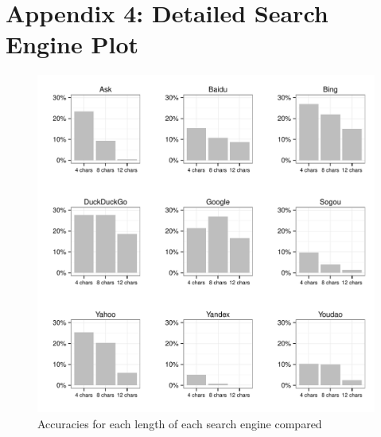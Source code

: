 \documentclass{csfourzero}
\begin{document}
\section{Appendix 4: Detailed Search Engine Plot}
\begin{figure}
  \centerline{\includegraphics[width=\textwidth]{eng_vs_acc_9_way}}
  \caption{Accuracies for each length of each search engine compared}\label{fig:9searchengines}
\end{figure}
\end{document}
